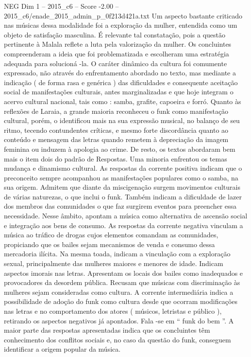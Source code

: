 \begin{textsample}{NEG Dim 1 – 2015\_c6 – Score -2.00 – 2015\_c6/enade\_2015\_admin\_p\_0f213d421a.txt}
Um aspecto bastante criticado nas músicas dessa modalidade foi a exploração da mulher, entendida como um objeto de satisfação masculina.
É relevante tal constatação, pois a questão pertinente à Malala reflete a luta pela valorização da mulher.
Os concluintes compreenderam a ideia que foi problematizada e escolheram uma estratégia adequada para solucioná -la.
O caráter dinâmico da cultura foi comumente expressado, não através do enfrentamento abordado no texto, mas mediante a indicação ( de forma rasa e genérica ) das dificuldades e consequente aceitação social de manifestações culturais, antes marginalizadas e que hoje integram o acervo cultural nacional, tais como : samba, grafite, capoeira e forró.
Quanto às reflexões de Laraia, a grande maioria reconheceu o funk como manifestação cultural, porém, o identificou mais na sua expressão musical, no balanço de seu ritmo, tecendo contundentes críticas, e mesmo forte discordância quanto ao conteúdo e mensagem das letras quando remetem à depreciação da imagem feminina ou induzem à apologia ao crime.
De resto, os textos abordaram bem mais o item dois do padrão de Respostas.
Uma minoria enfrentou os temas mudança e dinamismo cultural.
As respostas da corrente positiva indicam que o preconceito sempre acompanhou as manifestações populares como o samba, na sua origem.
Admitem que diante da miscigenação surgem movimentos culturais de várias naturezas, o que inclui o funk.
Também indicam a dificuldade de lazer dos membros das comunidades o que faz surgirem eventos para preencher essa necessidade.
Nesse âmbito, apontam a música como alternativa de ascensão social e integração aos bens de consumo.
As respostas da corrente negativa vinculam a música ao tráfico de drogas cujos elementos comandam as comunidades, propiciando que os bailes sejam mecanismos de venda e consumo dessa mercadoria ilícita.
Na mesma toada, indicam a vinculação com a exploração sexual, principalmente das mulheres maiores e menores de idade.
Indicam aspectos imorais nas letras.
Apresentam os locais dos bailes como inadequados e provocadores da desordem pública.
Recusam que músicas com discriminação às mulheres sejam consideradas como cultura.
A corrente intermediária indica a possibilidade de adoção do funk como cultura desde que ocorram modificações nas letras e no comportamento dos atores ( músicos, letristas e público ), retirando os aspectos negativos já apontados.
Fala -se em “ funk do bem ”.
A maior parte das respostas apresentadas indica que os concluintes têm conhecimento dos conflitos sociais e, no caso da questão do funk, conseguem identificar a origem popular da música.

\end{textsample}
